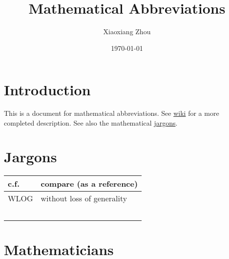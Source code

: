 \documentclass{amsart}
\numberwithin{equation}{section}
\theoremstyle{plain}
\numberwithin{equation}{section}
\theoremstyle{remark}
\begin{document}
\date{\today}

\title
{Mathematical Abbreviations
}
\author{Xiaoxiang Zhou}
\address{School of Mathematical Sciences\\
University of Bonn\\
Bonn, 53115\\ Germany\\} 


\maketitle
\tableofcontents


\section{Introduction}
This is a document for mathematical abbreviations. See \href{https://en.wikipedia.org/wiki/List_of_mathematical_abbreviations}{wiki} for a more completed description. See also the mathematical \href{https://en.wikipedia.org/wiki/List_of_mathematical_jargon}{jargons}.

\section{Jargons}

\begin{longtable}{l|l}
\hline
c.f. & compare (as a reference) \\ \hline
WLOG & without loss of generality  \\ \hline
 & \\ \hline
 & \\ \hline
 & \\ \hline
 & \\ \hline
 & \\ \hline
\end{longtable}

\section{Mathematicians}

\end{document}
